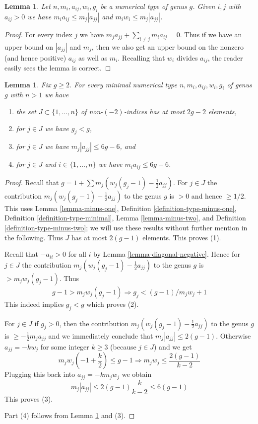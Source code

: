 \documentclass{stacks-project}
\theoremstyle{plain}
\newtheorem{lemma}[subsection]{Lemma}
\theoremstyle{definition}
\theoremstyle{remark}
\numberwithin{equation}{subsection}
\begin{document}
\begin{lemma}
\label{lemma-bound-neighbours}
Let $n, m_i, a_{ij}, w_i, g_i$ be a numerical type of genus $g$.
Given $i, j$ with $a_{ij} > 0$ we have
$m_ia_{ij} \leq m_j|a_{jj}|$ and $m_iw_i \leq m_j|a_{jj}|$.
\end{lemma}

\begin{proof}
For every index $j$ we have $m_j a_{jj} + \sum_{i \not = j} m_ia_{ij} = 0$.
Thus if we have an upper bound on $|a_{jj}|$ and $m_j$, then we also get an
upper bound on the nonzero (and hence positive) $a_{ij}$ as well as
$m_i$. Recalling that $w_i$ divides $a_{ij}$, the reader easily sees
the lemma is correct.
\end{proof}

\begin{lemma}
\label{lemma-bound-heart}
Fix $g \geq 2$. For every minimal numerical type $n, m_i, a_{ij}, w_i, g_i$
of genus $g$ with $n > 1$ we have
\begin{enumerate}
\item the set $J \subset \{1, \ldots, n\}$ of non-$(-2)$-indices
has at most $2g - 2$ elements,
\item for $j \in J$ we have $g_j < g$,
\item for $j \in J$ we have $m_j|a_{jj}| \leq 6g - 6$, and
\item for $j \in J$ and $i \in \{1, \ldots, n\}$
we have $m_ia_{ij} \leq 6g - 6$.
\end{enumerate}
\end{lemma}

\begin{proof}
Recall that $g = 1 + \sum m_j(w_j(g_j - 1) - \frac{1}{2} a_{jj})$.
For $j \in J$ the contribution $m_j(w_j(g_j - 1) - \frac{1}{2} a_{jj})$
to the genus $g$ is $> 0$ and hence $\geq 1/2$. This uses
Lemma \ref{lemma-minus-one},
Definition \ref{definition-type-minus-one},
Definition \ref{definition-type-minimal},
Lemma \ref{lemma-minus-two}, and
Definition \ref{definition-type-minus-two}; we will use these
results without further mention in the following.
Thus $J$ has at most $2(g - 1)$ elements.
This proves (1).

\medskip\noindent
Recall that $-a_{ii} > 0$ for all $i$ by Lemma \ref{lemma-diagonal-negative}.
Hence for $j \in J$ the contribution $m_j(w_j(g_j - 1) - \frac{1}{2} a_{jj})$
to the genus $g$ is $> m_jw_j(g_j - 1)$. Thus
$$
g - 1 > m_jw_j(g_j - 1) \Rightarrow g_j < (g - 1)/m_jw_j + 1
$$
This indeed implies $g_j < g$ which proves (2).

\medskip\noindent
For $j \in J$ if $g_j > 0$, then the contribution
$m_j(w_j(g_j - 1) - \frac{1}{2} a_{jj})$ to the genus $g$
is $\geq -\frac{1}{2}m_ja_{jj}$ and we immediately conclude
that $m_j|a_{jj}| \leq 2(g - 1)$. Otherwise $a_{jj} = -kw_j$
for some integer $k \geq 3$ (because $j \in J$) and we get
$$
m_jw_j(-1 + \frac{k}{2}) \leq g - 1
\Rightarrow
m_jw_j \leq \frac{2(g - 1)}{k - 2}
$$
Plugging this back into $a_{jj} = -km_jw_j$ we obtain
$$
m_j|a_{jj}| \leq 2(g - 1) \frac{k}{k - 2} \leq 6(g - 1)
$$
This proves (3).

\medskip\noindent
Part (4) follows from Lemma \ref{lemma-bound-neighbours} and (3).
\end{proof}
\end{document}
